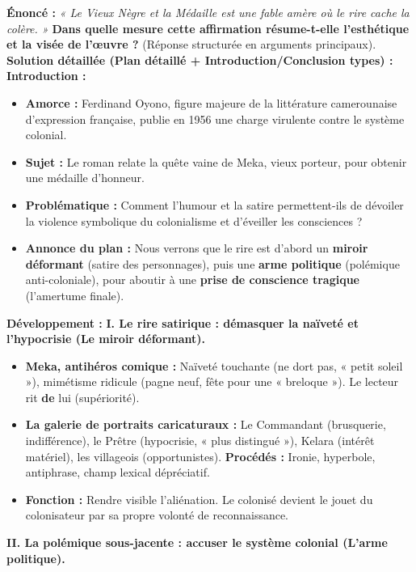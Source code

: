 \documentclass[11pt]{article}
\begin{document}
\begin{exoresolu}
\textbf{Énoncé :} \emph{« Le Vieux Nègre et la Médaille est une fable amère où le rire cache la colère. »} \textbf{Dans quelle mesure cette affirmation résume-t-elle l'esthétique et la visée de l'œuvre ?} (Réponse structurée en arguments principaux).
\tcblower
\textbf{Solution détaillée (Plan détaillé + Introduction/Conclusion types) :}
\textbf{Introduction :}
\begin{itemize}
    \item \textbf{Amorce :} Ferdinand Oyono, figure majeure de la littérature camerounaise d'expression française, publie en 1956 une charge virulente contre le système colonial.
    \item \textbf{Sujet :} Le roman relate la quête vaine de Meka, vieux porteur, pour obtenir une médaille d'honneur.
    \item \textbf{Problématique :} Comment l'humour et la satire permettent-ils de dévoiler la violence symbolique du colonialisme et d'éveiller les consciences ?
    \item \textbf{Annonce du plan :} Nous verrons que le rire est d'abord un \textbf{miroir déformant} (satire des personnages), puis une \textbf{arme politique} (polémique anti-coloniale), pour aboutir à une \textbf{prise de conscience tragique} (l'amertume finale).
\end{itemize}
\textbf{Développement :}
\textbf{I. Le rire satirique : démasquer la naïveté et l'hypocrisie (Le miroir déformant).}
\begin{itemize}
    \item \textbf{Meka, antihéros comique :} Naïveté touchante (ne dort pas, « petit soleil »), mimétisme ridicule (pagne neuf, fête pour une « breloque »). Le lecteur rit \textbf{de} lui (supériorité).
    \item \textbf{La galerie de portraits caricaturaux :} Le Commandant (brusquerie, indifférence), le Prêtre (hypocrisie, « plus distingué »), Kelara (intérêt matériel), les villageois (opportunistes). \textbf{Procédés :} Ironie, hyperbole, antiphrase, champ lexical dépréciatif.
    \item \textbf{Fonction :} Rendre visible l'aliénation. Le colonisé devient le jouet du colonisateur par sa propre volonté de reconnaissance.
\end{itemize}
\textbf{II. La polémique sous-jacente : accuser le système colonial (L'arme politique).}
\begin{itemize}

\end{itemize}
\end{exoresolu}
\end{document}
